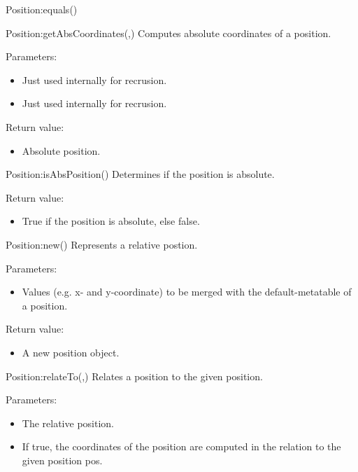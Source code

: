 \begin{luacommand}{{Position:equals}()}
\end{luacommand}\begin{luacommand}{{Position:getAbsCoordinates}(,)}
Computes absolute coordinates of a position.

Parameters:
\begin{itemize}
	\item[]  \subitem Just used internally for recrusion.\item[]  \subitem Just used internally for recrusion.
\end{itemize}


Return value:
\begin{itemize} \item[] Absolute position. \end{itemize}


\end{luacommand}\begin{luacommand}{{Position:isAbsPosition}()}
Determines if the position is absolute.


Return value:
\begin{itemize} \item[] True if the position is absolute, else false. \end{itemize}


\end{luacommand}\begin{luacommand}{{Position:new}()}
Represents a relative postion.

Parameters:
\begin{itemize}
	\item[]  \subitem Values (e.g. x- and y-coordinate) to be merged with the default-metatable of a position.
\end{itemize}


Return value:
\begin{itemize} \item[] A new position object. \end{itemize}


\end{luacommand}\begin{luacommand}{{Position:relateTo}(,)}
Relates a position to the given position.

Parameters:
\begin{itemize}
	\item[]  \subitem The relative position.\item[]  \subitem If true, the coordinates of the position are computed in the relation to the given position pos.
\end{itemize}



\end{luacommand}
